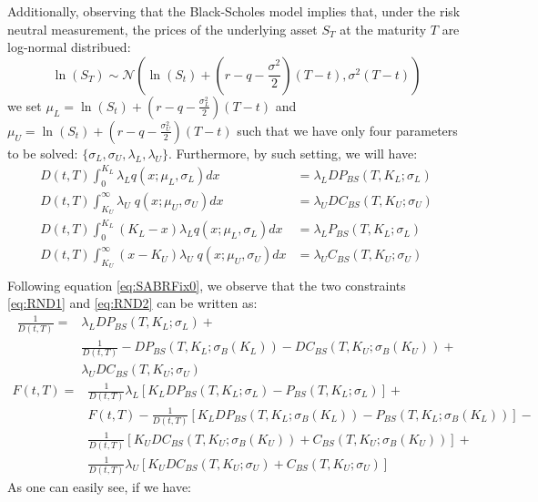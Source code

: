 \documentclass[letterpaper,12pt,titlepage,oneside,final]{book}
\numberwithin{equation}{section}
\theoremstyle{definition}
\begin{document}
 Additionally, observing that the Black-Scholes \cite{black1973pricing} model implies that, under the risk neutral measurement, the prices of the underlying asset $S_T$ at the maturity $T$ are log-normal distribued:
 \[
 \ln(S_T) \sim  \mathcal{N}(\ln(S_t)+(r-q-\frac{\sigma^2}{2})(T-t),\sigma^2 (T-t))
 \]
we set $\mu_L=\ln(S_t)+(r-q-\frac{\sigma_L^2}{2})(T-t)$ and $\mu_U=\ln(S_t)+(r-q-\frac{\sigma_U^2}{2})(T-t)$ such that we have only four parameters to be solved: $\{\sigma_{L},\sigma_{U}, \lambda_{L}, \lambda_{U}\}$. Furthermore, by such setting, we will have:
\begin{equation}
\begin{split}
D(t,T)\int_{0}^{K_{L}}	\lambda_{L}   q(x;\mu_{L},\sigma_{L}) dx&=\lambda_{L} DP_{BS}(T,K_{L};\sigma_{L})\\
D(t,T)\int_{K_{U}}^{\infty}	 \lambda_{U} \;  q(x;\mu_{U},\sigma_{U}) dx&=\lambda_{U} DC_{BS}(T,K_{U};\sigma_{U})\\
D(t,T)\int_{0}^{K_{L}} (K_L-x)	\lambda_{L}   q(x;\mu_{L},\sigma_{L}) dx&=\lambda_{L} P_{BS}(T,K_{L};\sigma_{L})\\
D(t,T)\int_{K_{U}}^{\infty}	(x-K_U) \lambda_{U} \;  q(x;\mu_{U},\sigma_{U}) dx&=\lambda_{U} C_{BS}(T,K_{U};\sigma_{U})\\
\end{split}
\label{eq:SABRFix0}
\end{equation}
Following equation \eqref{eq:SABRFix0}, we observe that the two constraints \eqref{eq:RND1} and \eqref{eq:RND2} can be written as:
\begin{equation}
	\begin{split}\frac{1}{D(t,T)}=&
\lambda_{L} DP_{BS}(T,K_{L};\sigma_{L})+\\
&\frac{1}{D(t,T)}-DP_{BS}(T,K_{L};\sigma_{B}(K_L))-DC_{BS}(T,K_{U};\sigma_{B}(K_U))+\\
&\lambda_{U} DC_{BS}(T,K_{U};\sigma_{U})
\end{split}
\label{eq:RND5}
\end{equation}
\begin{equation}
	 \begin{split}
		F(t,T)=&\frac{1}{D(t,T)}\lambda_L[K_{L}DP_{BS}(T,K_{L};\sigma_{L})-P_{BS}(T,K_{L};\sigma_{L})]+\\
		&F(t,T)-\frac{1}{D(t,T)}[K_{L}DP_{BS}(T,K_{L};\sigma_{B}(K_{L}))-P_{BS}(T,K_{L};\sigma_{B}(K_{L}))]-\\
		&\frac{1}{D(t,T)}[K_{U}DC_{BS}(T,K_{U};\sigma_{B}(K_{U}))+C_{BS}(T,K_{U};\sigma_{B}(K_{U}))]+\\
		&\frac{1}{D(t,T)}\lambda_U[K_{U}DC_{BS}(T,K_{U};\sigma_{U})+C_{BS}(T,K_{U};\sigma_{U})]
		\end{split}
	\label{eq:RND6}
\end{equation}
As one can easily see, if we have:
\end{document}
